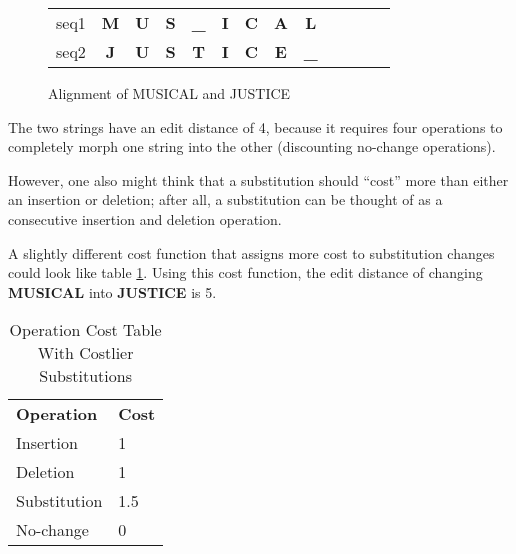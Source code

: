 \begin{figure}[!h]
\centering
\begin{tabular}{lcccccccccccc}
seq1 & {\color[HTML]{6200C9} \textbf{M}} & \textbf{U} & \textbf{S} & {\color[HTML]{009901} \textbf{\_}} & \textbf{I} & \textbf{C} & {\color[HTML]{6200C9} \textbf{A}} & {\color[HTML]{9A0000} \textbf{L}}  & \textbf{} & \textbf{} & \textbf{} &  \\
seq2 & {\color[HTML]{6200C9} \textbf{J}} & \textbf{U} & \textbf{S} & {\color[HTML]{009901} \textbf{T}}  & \textbf{I} & \textbf{C} & {\color[HTML]{6200C9} \textbf{E}} & {\color[HTML]{9A0000} \textbf{\_}} & \textbf{} & \textbf{} & \textbf{} & 
\end{tabular}
\caption{Alignment of MUSICAL and JUSTICE}
\label{best-alignment}
\end{figure}

The two strings have an edit distance of 4, because it requires four operations to completely morph one string into the other (discounting no-change operations).

However, one also might think that a substitution should ``cost'' more than either an insertion or deletion; after all, a substitution can be thought of as a consecutive insertion and deletion operation. 

A slightly different cost function that assigns more cost to substitution changes could look like table \ref{tab:naivetable2}. Using this cost function, the edit distance of changing \textbf{MUSICAL} into \textbf{JUSTICE} is 5.
\begin{table}[!h]
\centering
\begin{tabular}{ll}
\textbf{Operation} & \textbf{Cost} \\
Insertion          & 1             \\
Deletion           & 1             \\
Substitution       & 1.5             \\
No-change          & 0            
\end{tabular}
\caption{Operation Cost Table With Costlier Substitutions}
\label{tab:naivetable2}
\end{table}

